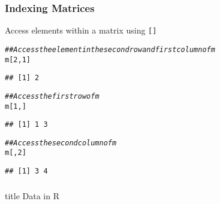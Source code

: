\documentclass{beamer}\usepackage[]{graphicx}\usepackage[]{color}
\makeatletter
\newcommand{\hlnum}[1]{\textcolor[rgb]{0.686,0.059,0.569}{#1}}%
\newcommand{\hlcom}[1]{\textcolor[rgb]{0.678,0.584,0.686}{\textit{#1}}}%
\newcommand{\hlstd}[1]{\textcolor[rgb]{0.345,0.345,0.345}{#1}}%
\newenvironment{kframe}{%
 \def\at@end@of@kframe{}%
 \ifinner\ifhmode%
  \def\at@end@of@kframe{\end{minipage}}%
  \begin{minipage}{\columnwidth}%
 \fi\fi%
 \def\FrameCommand##1{\hskip\@totalleftmargin \hskip-\fboxsep
 \colorbox{shadecolor}{##1}\hskip-\fboxsep
     \hskip-\linewidth \hskip-\@totalleftmargin \hskip\columnwidth}%
 \MakeFramed {\advance\hsize-\width
   \@totalleftmargin\z@ \linewidth\hsize
   \@setminipage}}%
 {\par\unskip\endMakeFramed%
 \at@end@of@kframe}
\newenvironment{knitrout}{}{} %
\makeatother
\begin{document}
\begin{frame}[fragile]\frametitle{Indexing Matrices}
    Access elements within a matrix using \texttt{[]}
\begin{knitrout}\footnotesize
{}\color{fgcolor}\begin{kframe}
\begin{alltt}
\hlcom{## Access the element in the second row and first column of m}
\hlstd{m[}\hlnum{2}\hlstd{,} \hlnum{1}\hlstd{]}
\end{alltt}
\begin{verbatim}
## [1] 2
\end{verbatim}
\begin{alltt}
\hlcom{## Access the first row of m}
\hlstd{m[}\hlnum{1}\hlstd{, ]}
\end{alltt}
\begin{verbatim}
## [1] 1 3
\end{verbatim}
\begin{alltt}
\hlcom{## Access the second column of m}
\hlstd{m[,} \hlnum{2}\hlstd{]}
\end{alltt}
\begin{verbatim}
## [1] 3 4
\end{verbatim}
\end{kframe}
\end{knitrout}
\end{frame}

\begin{frame}\frametitle{}
    \vfill
    \centering
    \begin{beamercolorbox}[center]{title}
        \Large Data in R
    \end{beamercolorbox}
    \vfill
\end{frame}
\end{document}

